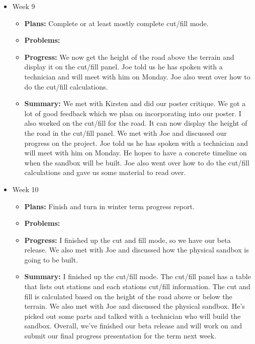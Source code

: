 \documentclass[onecolumn, draftclsnofoot,10pt, compsoc]{IEEEtran}
\begin{document}
\begin{itemize}
\begin{itemize}
	\end{itemize}
\item Week 9
	\begin{itemize}
	\item \textbf{Plans:} Complete or at least mostly complete cut/fill mode.
    \item \textbf{Problems:} 
    \item \textbf{Progress:} We now get the height of the road above the terrain and display it on the cut/fill panel. Joe told us he has spoken with a technician and will meet with him on Monday. Joe also went over how to do the cut/fill calculations.
    \item \textbf{Summary:} We met with Kirsten and did our poster critique. We got a lot of good feedback which we plan on incorporating into our poster. I also worked on the cut/fill for the road. It can now display the height of the road in the cut/fill panel. We met with Joe and discussed our progress on the project. Joe told us he has spoken with a technician and will meet with him on Monday. He hopes to have a concrete timeline on when the sandbox will be built. Joe also went over how to do the cut/fill calculations and gave us some material to read over.
	\end{itemize}
\item Week 10
	\begin{itemize}
	\item \textbf{Plans:} Finish and turn in winter term progress report.
    \item \textbf{Problems:} 
    \item \textbf{Progress:} I finished up the cut and fill mode, so we have our beta release. We also met with Joe and discussed how the physical sandbox is going to be built.
    \item \textbf{Summary:} I finished up the cut/fill mode. The cut/fill panel has a table that lists out stations and each stations cut/fill information. The cut and fill is calculated based on the height of the road above or below the terrain. We also met with Joe and discussed the physical sandbox. He's picked out some parts and talked with a technician who will build the sandbox. Overall, we've finished our beta release and will work on and submit our final progress presentation for the term next week.
	\end{itemize}
\end{itemize}
\end{document}
